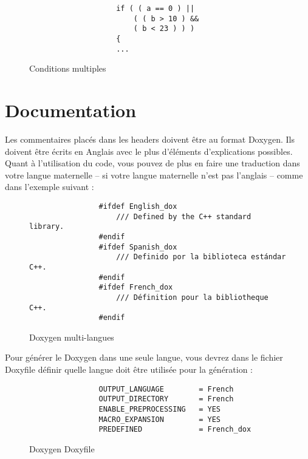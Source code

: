 			\begin{figure}[H]
				\begin{changemargin}{-2.5cm}{-2.5cm}
				\begin{tcolorbox}
				\begin{verbatim}
					if ( ( a == 0 ) ||
					    ( ( b > 10 ) &&
					    ( b < 23 ) ) )
					{
					...
				\end{verbatim}
				\end{tcolorbox}
				\end{changemargin}
				\caption{Conditions multiples}
			\end{figure}

	\section{Documentation}
		Les commentaires placés dans les headers doivent être au format Doxygen. Ils doivent être écrits en Anglais avec le plus d'éléments d'explications possibles. Quant à l'utilisation du code, vous pouvez de plus en faire une traduction dans votre langue maternelle -- si votre langue maternelle n'est pas l'anglais -- comme dans l'exemple suivant :

		\begin{figure}[H]
			\begin{changemargin}{-2.5cm}{-2.5cm}
			\begin{tcolorbox}
			\begin{verbatim}
				#ifdef English_dox 
				    /// Defined by the C++ standard library. 
				#endif
				#ifdef Spanish_dox
				    /// Definido por la biblioteca estándar C++. 
				#endif
				#ifdef French_dox
				    /// Définition pour la bibliotheque C++. 
				#endif
			\end{verbatim}
			\end{tcolorbox}
			\end{changemargin}
			\caption{Doxygen multi-langues}
		\end{figure}

		Pour générer le Doxygen dans une seule langue, vous devrez dans le fichier Doxyfile définir quelle langue doit être utilisée pour la génération :

		\begin{figure}[H]
			\begin{changemargin}{-2.5cm}{-2.5cm}
			\begin{tcolorbox}
			\begin{verbatim}
				OUTPUT_LANGUAGE        = French
				OUTPUT_DIRECTORY       = French
				ENABLE_PREPROCESSING   = YES
				MACRO_EXPANSION        = YES
				PREDEFINED             = French_dox
			\end{verbatim}
			\end{tcolorbox}
			\end{changemargin}
			\caption{Doxygen Doxyfile}
		\end{figure}

